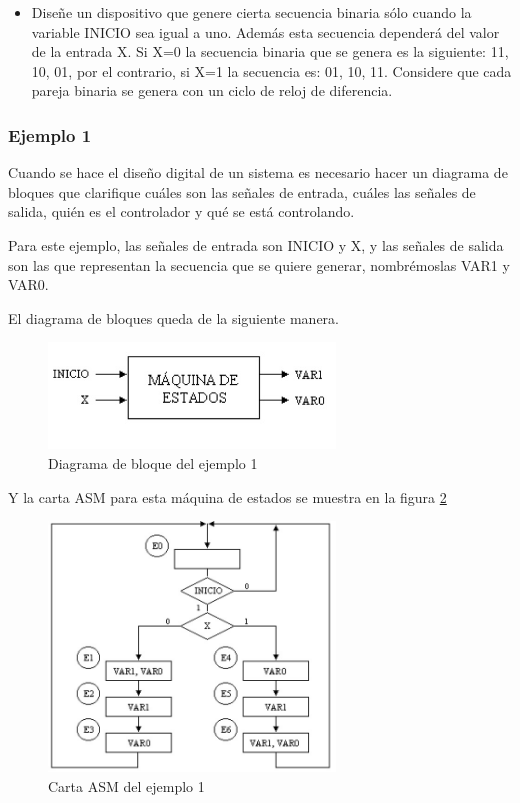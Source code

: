 \documentclass[12pt]{book}
\theoremstyle{definition}
\theoremstyle{remark}
\theoremstyle{plain}
\begin{document}
\begin{itemize}
\item Diseñe un dispositivo que genere cierta secuencia binaria sólo cuando la variable INICIO sea
igual a uno. Además esta secuencia dependerá del valor de la entrada X. Si X=0 la secuencia binaria que se genera es la siguiente: 11, 10, 01, por el contrario, si X=1 la secuencia es: 01,
10, 11. Considere que cada pareja binaria se genera con un ciclo de reloj de diferencia.

\end{itemize}
\subsubsection{Ejemplo 1}
Cuando se hace el diseño digital de un sistema es necesario hacer un diagrama de bloques que
clarifique cuáles son las señales de entrada, cuáles las señales de salida, quién es el controlador y
qué se está controlando.

Para este ejemplo, las señales de entrada son INICIO y X, y las señales de salida son las que
representan la secuencia que se quiere generar, nombrémoslas VAR1 y VAR0.

El diagrama de bloques queda de la siguiente manera.

\begin{figure}
\centering
\includegraphics[width=3in]{EjemploMaquina1.jpg}
\caption{Diagrama de bloque del ejemplo 1}
\label{fig18}
\end{figure}

Y la carta ASM para esta máquina de estados se muestra en la figura \ref{fig19}

\begin{figure}
\centering
\includegraphics[width=3in]{ASMEjemplo1.jpg}
\caption{Carta ASM del ejemplo 1}
\label{fig19}
\end{figure}
\end{document}

